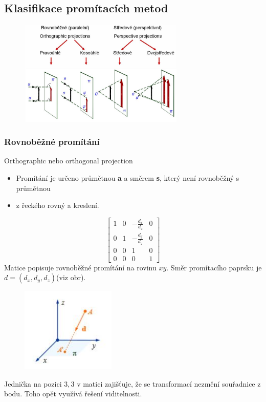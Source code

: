 \subsection{Klasifikace promítacích metod}
\begin{figure}[H]
\centering
\includegraphics[width=0.7\textwidth]{assets/2_klas_promitani}
\end{figure}

\subsubsection{Rovnoběžné promítání}
Orthographic nebo orthogonal projection
\begin{itemize}
	\item Promítání je určeno průmětnou \textbf{a} a směrem \textbf{s}, který není rovnoběžný s průmětnou
	\item z řeckého  rovný a  kreslení.
\end{itemize}
\begin{equation*}
			 \begin{bmatrix}
			     1 & 0 & -\frac{d_x}{d_z} & 0       \\[0.3em]
    			 0 & 1 & -\frac{d_y}{d_z} & 0       \\[0.3em]
     			 0 & 0 & 1 & 0 	\\[0.3em]
     			 0 & 0 & 0 & 1       
			  \end{bmatrix}
		\end{equation*}
Matice popisuje rovnoběžné promítání na rovinu $xy$. Směr promítacího paprsku je $d = (d_x, d_y, d_z)$(viz obr).
\begin{figure}[H]
\centering
\includegraphics[width=0.4\textwidth]{assets/2_overeni_rovnobezneho_promitani}
\end{figure}
Jednička na pozici $3,3$ v matici zajišťuje, že se transformací nezmění souřadnice z bodu. Toho opět využívá řešení viditelnosti.
